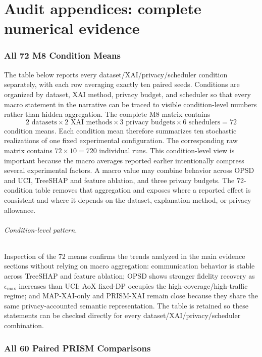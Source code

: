 \documentclass[11pt]{article}
\begin{document}
\clearpage
\part{Audit appendices: complete numerical evidence}
\appendix
\section{All 72 M8 Condition Means}\label{app:72}

The table below reports every dataset/XAI/privacy/scheduler condition separately, with each row averaging exactly ten paired seeds. Conditions are organized by dataset, XAI method, privacy budget, and scheduler so that every macro statement in the narrative can be traced to visible condition-level numbers rather than hidden aggregation.
The complete M8 matrix contains
$$
2\text{ datasets}
\times
2\text{ XAI methods}
\times
3\text{ privacy budgets}
\times
6\text{ schedulers}
=
72
$$
condition means. Each condition mean therefore summarizes ten stochastic realizations of one fixed experimental configuration. The corresponding raw matrix contains \(72\times10=720\) individual runs.
This condition-level view is important because the macro averages reported earlier intentionally compress several experimental factors. A macro value may combine behavior across OPSD and UCI, TreeSHAP and feature ablation, and three privacy budgets. The 72-condition table removes that aggregation and exposes where a reported effect is consistent and where it depends on the dataset, explanation method, or privacy allowance.

\paragraph{Condition-level pattern.}
Inspection of the 72 means confirms the trends analyzed in the main evidence sections without relying on macro aggregation: communication behavior is stable across TreeSHAP and feature ablation; OPSD shows stronger fidelity recovery as $\epsilon_{\max}$ increases than UCI; AoX fixed-DP occupies the high-coverage/high-traffic regime; and MAP-XAI-only and PRISM-XAI remain close because they share the same privacy-accounted semantic representation. The table is retained so these statements can be checked directly for every dataset/XAI/privacy/scheduler combination.
\tiny{}

\clearpage
\small
\section{All 60 Paired PRISM Comparisons}\label{app:paired}
\end{document}
